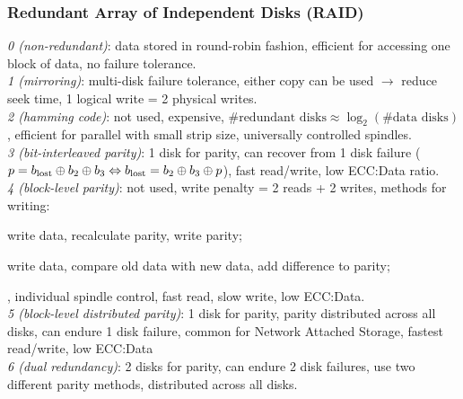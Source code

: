 \subsubsection*{Redundant Array of Independent Disks (RAID)}

\emph{0 (non-redundant)}: data stored in round-robin fashion,
efficient for accessing one block of data, no failure tolerance.\\
\emph{1 (mirroring)}: multi-disk failure tolerance,
either copy can be used $\rightarrow$ reduce seek time,
1 logical write = 2 physical writes.\\
\emph{2 (hamming code)}: not used, expensive,
$\text{\# redundant disks} \approx \log_2(\text{\# data disks})$,
efficient for parallel with small strip size, universally controlled spindles.\\
\emph{3 (bit-interleaved parity)}: 1 disk for parity, can recover from 1 disk failure
($p=b_\text{lost}\oplus b_2\oplus b_3 \Leftrightarrow b_\text{lost}=b_2\oplus b_3\oplus p$),
fast read/write, low ECC:Data ratio.\\
\emph{4 (block-level parity)}: not used, write penalty = 2 reads + 2 writes,
methods for writing: \begin{enuminline}
\item write data, recalculate parity, write parity;
\item write data, compare old data with new data, add difference to parity;
\end{enuminline}, individual spindle control, fast read, slow write, low ECC:Data.\\
\emph{5 (block-level distributed parity)}: 1 disk for parity, parity distributed across all disks,
can endure 1 disk failure, common for Network Attached Storage, fastest read/write, low ECC:Data\\
\emph{6 (dual redundancy)}: 2 disks for parity, can endure 2 disk failures,
use two different parity methods, distributed across all disks.